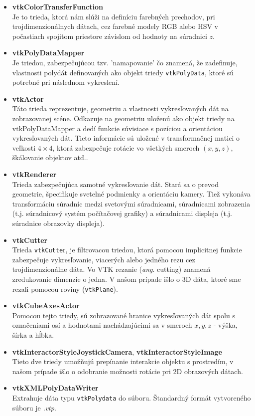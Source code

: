 \documentclass[a4paper,11pt,oneside]{article}%
\begin{document}
\begin{itemize}
\item \textbf{vtkColorTransferFunction} \\
Je to trieda, ktorá nám slúži na definíciu farebných prechodov, pri trojdimenzionálnych dátach, cez farebné modely RGB alebo HSV v počastiach spojitom priestore závislom od hodnoty na súradnici $z$. 

\item \textbf{vtkPolyDataMapper} \\
Je triedou, zabezpečujúcou tzv. 'namapovanie' čo znamená, že zadefinuje, vlastnosti polydát definovaných ako objekt triedy \texttt{vtkPolyData}, ktoré sú potrebné pri následnom vykreslení.

\item \textbf{vtkActor} \\
Táto trieda reprezentuje, geometriu a vlastnosti vykresľovaných dát na zobrazovanej scéne. Odkazuje na geometriu uloženú ako objekt triedy na vtkPolyDataMapper a dedí funkcie súvisiace s pozíciou a orientáciou vykresľovaných dát. Tieto informácie sú uložené v transformačnej matici o veľkosti $4\times4$, ktorá zabezpečuje rotácie vo všetkých smeroch $(x, y, z)$, škálovanie objektov atď..

\item \textbf{vtkRenderer} \\
Trieda zabezpečujúca samotné vykresľovanie dát. Stará sa o prevod geometrie, špecifikuje svetelné podmienky a orientáciu kamery. Tiež vykonáva transformáciu súradníc medzi svetovými súradnicami, súradnicami zobrazenia (t.j. súradnicový systém počítačovej grafiky) a súradnicami displeja (t.j.  súradnice obrazovky displeja).

\item \textbf{vtkCutter} \\
Trieda \texttt{vtkCutte}r, je filtrovacou triedou, ktorá pomocou implicitnej funkcie zabezpečuje vykresľovanie, viacerých alebo jedného rezu cez trojdimenzionálne dáta. Vo VTK rezanie (\textit{ang}. cutting) znamená zredukovanie dimenzie o jedna. V našom prípade išlo o 3D dáta, ktoré sme rezali pomocou roviny (\texttt{vtkPlane}). 

\item \textbf{vtkCubeAxesActor} \\
Pomocou tejto triedy, sú zobrazované hranice vykresľovaných dát spolu s označeniami osí a  hodnotami nachádzajúcimi sa v smeroch $x, y, z$ - výška, šírka a hĺbka.

\item \textbf{vtkInteractorStyleJoystickCamera}, \textbf{vtkInteractorStyleImage}  \\
Tieto dve triedy umožňujú prepínanie interakcie objektu s prostredím, v našom prípade išlo o odobranie možnosti rotácie pri 2D obrazových dátach.

\item \textbf{vtkXMLPolyDataWriter} \\
Extrahuje dáta typu \texttt{vtkPolydata} do súboru. Štandardný formát vytvoreného súboru je \textit{.vtp}. 
\end{itemize}
\end{document}
